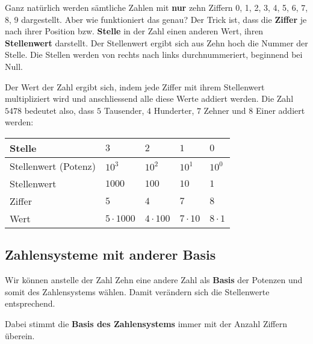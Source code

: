 Ganz natürlich werden sämtliche Zahlen mit \textbf{nur} zehn Ziffern 0, 1, 2, 3, 4, 5, 6, 7, 8, 9 dargestellt. Aber wie funktioniert das genau? Der Trick ist, dass die \textbf{Ziffer} je nach ihrer Position bzw. \textbf{Stelle} in der Zahl einen anderen Wert, ihren \textbf{Stellenwert} darstellt. Der Stellenwert ergibt sich aus Zehn hoch die Nummer der Stelle. Die Stellen werden von rechts nach links durchnummeriert, beginnend bei Null.

Der Wert der Zahl ergibt sich, indem jede Ziffer mit ihrem Stellenwert multipliziert wird und anschliessend alle diese Werte addiert werden. Die Zahl $5478$ bedeutet also, dass $5$ Tausender, $4$ Hunderter, $7$ Zehner und $8$ Einer addiert werden:
\begin{center}
  \renewcommand{\arraystretch}{1}
  \begin{tabularx}{0.9\textwidth}{lCCCC}
  \toprule
    Stelle & $3$ & $2$ & $1$ & $0$ \\
  \midrule
    Stellenwert (Potenz) & $10^{3}$ & $10^{2}$ & $10^{1}$ & $10^{0}$ \\
  \midrule
    Stellenwert & $1000$ & $100$ & $10$ & $1$ \\
  \midrule
    Ziffer & $5$ & $4$ & $7$ & $8$ \\
  \midrule
    Wert & $5\cdot 1000$ & $4\cdot 100$ & $7\cdot 10$ & $8\cdot 1$ \\
  \bottomrule
  \end{tabularx}
\end{center}

\subsection{Zahlensysteme mit anderer Basis}

Wir können anstelle der Zahl Zehn eine andere Zahl als \textbf{Basis} der Potenzen und somit des Zahlensystems wählen. Damit verändern sich die Stellenwerte entsprechend.

Dabei stimmt die \textbf{Basis des Zahlensystems} immer mit der Anzahl Ziffern überein.


